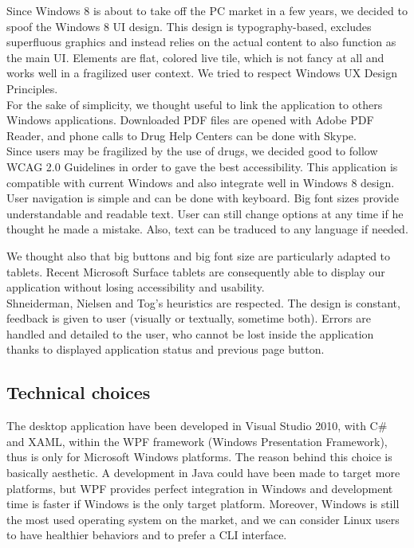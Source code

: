\documentclass[a4paper,12pt, twocolumn]{article}
\begin{document}
Since Windows 8 is about to take off the PC market in a few years, we decided to spoof the Windows 8 UI design. This design is typography-based, excludes superfluous graphics and instead relies on the actual content to also function as the main UI. Elements are flat, colored live tile, which is not fancy at all and works well in a fragilized user context. We tried to respect Windows UX Design Principles.\\

For the sake of simplicity, we thought useful to link the application to others Windows applications. Downloaded PDF files are opened with Adobe PDF Reader, and phone calls to Drug Help Centers can be done with Skype.\\

Since users may be fragilized by the use of drugs, we decided good to follow WCAG 2.0 Guidelines in order to gave the best accessibility. This application is compatible with current Windows and also integrate well in Windows 8 design. User navigation is simple and can be done with keyboard. Big font sizes provide understandable and readable text. User can still change options at any time if he thought he made a mistake. Also, text can be traduced to any language if needed.

We thought also that big buttons and big font size are particularly adapted to tablets. Recent Microsoft Surface tablets are consequently able to display our application without losing accessibility and usability.\\

Shneiderman, Nielsen and Tog's heuristics are respected. The design is constant, feedback is given to user (visually or textually, sometime both). Errors are handled and detailed to the user, who cannot be lost inside the application thanks to displayed application status and previous page button.

\subsection*{Technical choices}

The desktop application have been developed in Visual Studio 2010, with C\# and XAML, within the WPF framework (Windows Presentation Framework), thus is only for Microsoft Windows platforms. The reason behind this choice is basically aesthetic. A development in Java could have been made to target more platforms, but WPF provides perfect integration in Windows and development time is faster if Windows is the only target platform. Moreover, Windows is still the most used operating system on the market, and we can consider Linux users to have healthier behaviors and to prefer a CLI interface.\\
\end{document}
